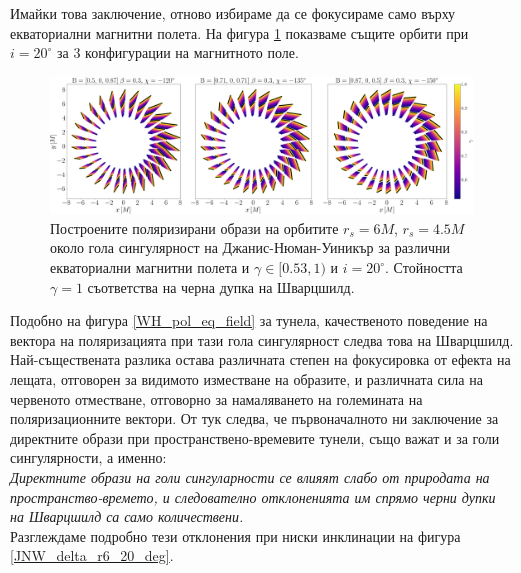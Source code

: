 Имайки това заключение, отново избираме да се фокусираме само върху екваториални магнитни полета. На фигура \ref{JNW_pol_eq_field} показваме същите орбити при $i = 20^\circ$ за 3 конфигурации на магнитното поле.\\

\begin{figure}[!htb]
	\centering
	\includegraphics[scale = 0.18]{JNW_alpha_Eq_Field.png}
	\caption[Поляризирани образи около гола сингулярност на Джанис-Нюман-Уиникър за различни екваториални магнитни полета.]{\small Построените поляризирани образи на орбитите $r_s = 6M$, $r_s = 4.5M$ около гола сингулярност на Джанис-Нюман-Уиникър за различни екваториални магнитни полета и $\gamma \in[0.53,1)$ и $i = 20^\circ$. Стойността $\gamma = 1$ съответства на черна дупка на Шварцшилд.} 
	\label{JNW_pol_eq_field}
\end{figure}

Подобно на фигура \ref{WH_pol_eq_field} за  тунела, качественото поведение на вектора на поляризацията при тази гола сингулярност следва това на Шварцшилд. Най-съществената разлика остава различната степен на фокусировка от ефекта на лещата, отговорен за видимото изместване на образите, и различната сила на червеното отместване, отговорно за намаляването на големината на поляризационните вектори. От тук следва, че първоначалното ни заключение за директните образи при пространствено-времевите тунели, също важат и за голи сингулярности, а именно:\\

\emph{Директните образи на голи сингуларности се влияят слабо от природата на пространство-времето, и следователно отклоненията им спрямо черни дупки на Шварцшилд са само количествени.}\\

Разглеждаме подробно тези отклонения при ниски инклинации на фигура \ref{JNW_delta_r6_20_deg}.

